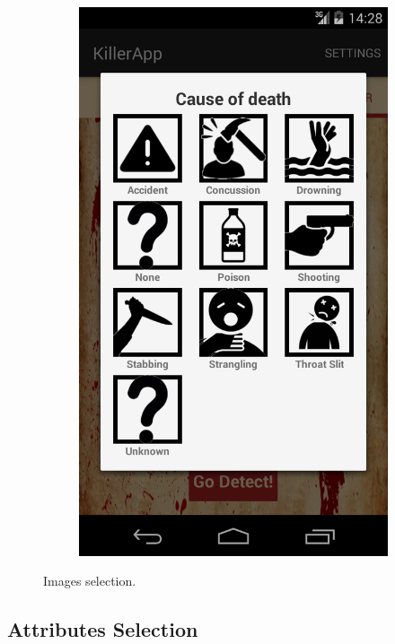 \documentclass{mproj}
\begin{document}
\begin{figure}[h]
\begin{subfigure}{0.3\textwidth}
		\includegraphics[width=\textwidth]{images/grid_selector}
	\end{subfigure}			
	\caption{Images selection.}
	\label{fig:images_selection}
\end{figure}

\subsection*{Attributes Selection}\label{attributes}
\end{document}
